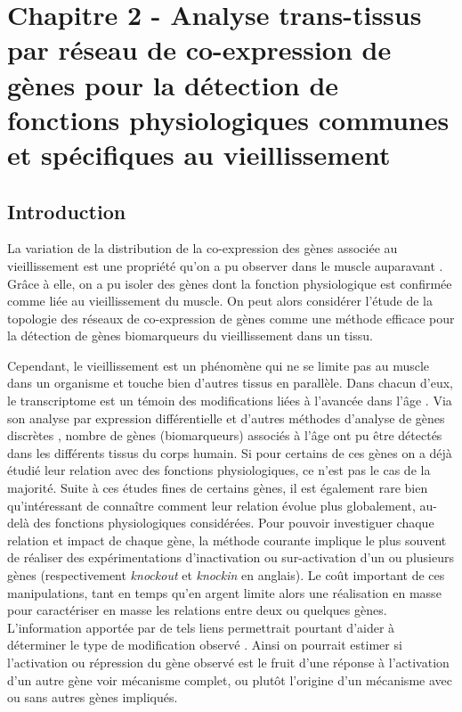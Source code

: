 \chapter{Chapitre 2 - Analyse trans-tissus par réseau de co-expression de gènes pour la détection de fonctions physiologiques communes et spécifiques au vieillissement}
\label{chapter:multidim}

\section{Introduction}

La variation de la distribution de la co-expression des gènes associée au vieillissement est une propriété qu'on a pu observer dans le muscle auparavant . Grâce à elle, on a pu isoler des gènes dont la fonction physiologique  est confirmée comme liée au vieillissement du muscle. On peut alors considérer l'étude de la topologie des réseaux de co-expression de gènes comme une méthode efficace pour la détection de gènes biomarqueurs du vieillissement dans un tissu. 

Cependant, le vieillissement est un phénomène qui ne se limite pas au muscle dans un organisme et touche bien d'autres tissus en parallèle. Dans chacun d'eux, le transcriptome est un témoin des modifications liées à l'avancée dans l'âge . Via son analyse par expression différentielle et d'autres méthodes d'analyse de gènes discrètes , nombre de gènes (biomarqueurs) associés à l'âge ont pu être détectés dans les différents tissus du corps humain. Si pour certains de ces gènes on a déjà étudié leur relation avec des fonctions physiologiques, ce n'est pas le cas de la majorité. Suite à ces études fines de certains gènes, il est également rare bien qu'intéressant de connaître comment leur relation évolue plus globalement, au-delà des fonctions physiologiques considérées.
Pour pouvoir investiguer chaque relation et impact de chaque gène, la méthode courante implique le plus souvent de réaliser des expérimentations d'inactivation ou sur-activation d'un ou plusieurs gènes (respectivement \textit{knockout} et \textit{knockin} en anglais). Le coût important de ces manipulations, tant en temps qu'en argent limite alors une réalisation en masse pour caractériser en masse les relations entre deux ou quelques gènes. 
L'information apportée par de tels liens permettrait pourtant d'aider à déterminer le type de modification observé . Ainsi on pourrait estimer si l'activation ou répression du gène observé est le fruit d'une réponse à l'activation d'un autre gène voir mécanisme  complet, ou plutôt l'origine d'un mécanisme avec ou sans autres gènes impliqués.

